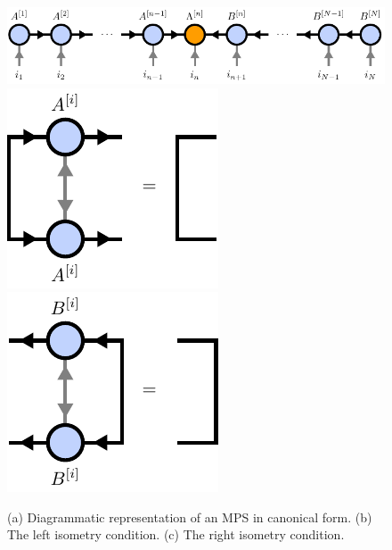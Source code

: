 \begin{figure}
	\centering
	\subcaptionbox{\label{fig:mps_canonical_form_general_definition}}
	{%
		\includegraphics[scale=1]{figures/tikz/Tensor_Networks/mps_canonical_form/mps_canonical_form_a.pdf}
	}
	\subcaptionbox{\label{fig:mps_left_isometry_condition}}
	{%
		\includegraphics[scale=1]{figures/tikz/Tensor_Networks/mps_canonical_form/mps_canonical_form_b.pdf}
	}
	\quad\quad\quad\quad\quad\quad
	\subcaptionbox{\label{fig:mps_right_isometry_condition}}
	{%
		\includegraphics[scale=1]{figures/tikz/Tensor_Networks/mps_canonical_form/mps_canonical_form_c.pdf}
	}
	\caption{(a) Diagrammatic representation of an MPS in canonical form. (b) The left isometry condition. (c) The right isometry condition.}
	\label{fig:mps_canonical}
\end{figure}
